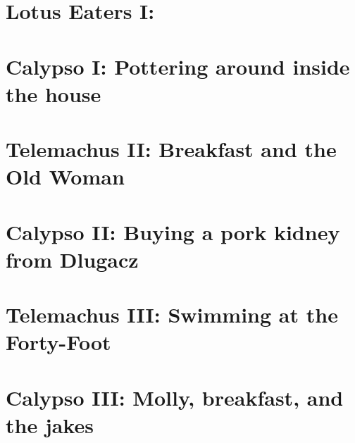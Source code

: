 \newpage


\setcounter{page}{1}

\section*{Lotus Eaters I: }


\section*{Calypso I: Pottering around inside the house}



\section*{Telemachus II: Breakfast and the Old Woman}


\section*{Calypso II: Buying a pork kidney from Dlugacz}



\section*{Telemachus III: Swimming at the Forty-Foot}


\section*{Calypso III: Molly, breakfast, and the jakes}



